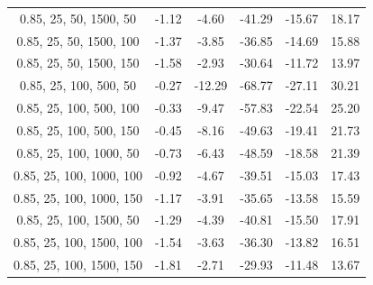 \documentclass[
]{article}
\begin{document}
\begin{table}[H]
{\begin{tabular}{|c|c|c|c|c|c|}
                0.85, 25, 50, 1500, 50     & -1.12                      & -4.60                      & -41.29                     & -15.67                   & 18.17                   \\
                0.85, 25, 50, 1500, 100    & -1.37                      & -3.85                      & -36.85                     & -14.69                   & 15.88                   \\
                0.85, 25, 50, 1500, 150    & -1.58                      & -2.93                      & -30.64                     & -11.72                   & 13.97                   \\
                0.85, 25, 100, 500, 50     & -0.27                      & -12.29                     & -68.77                     & -27.11                   & 30.21                   \\
                0.85, 25, 100, 500, 100    & -0.33                      & -9.47                      & -57.83                     & -22.54                   & 25.20                   \\
                0.85, 25, 100, 500, 150    & -0.45                      & -8.16                      & -49.63                     & -19.41                   & 21.73                   \\
                0.85, 25, 100, 1000, 50    & -0.73                      & -6.43                      & -48.59                     & -18.58                   & 21.39                   \\
                0.85, 25, 100, 1000, 100   & -0.92                      & -4.67                      & -39.51                     & -15.03                   & 17.43                   \\
                0.85, 25, 100, 1000, 150   & -1.17                      & -3.91                      & -35.65                     & -13.58                   & 15.59                   \\
                0.85, 25, 100, 1500, 50    & -1.29                      & -4.39                      & -40.81                     & -15.50                   & 17.91                   \\
                0.85, 25, 100, 1500, 100   & -1.54                      & -3.63                      & -36.30                     & -13.82                   & 16.51                   \\
                0.85, 25, 100, 1500, 150   & -1.81                      & -2.71                      & -29.93                     & -11.48                   & 13.67                   \\

\end{tabular}}
\end{table}
\end{document}
